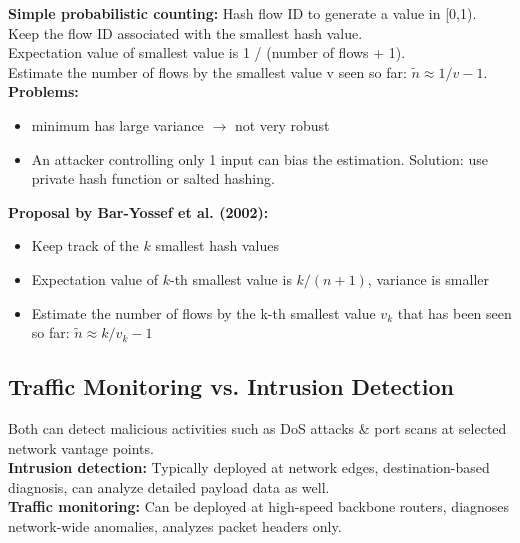 \textbf{Simple probabilistic counting:} Hash flow ID to generate a value in [0,1). Keep the flow ID associated with the smallest hash value.\\
Expectation value of smallest value is 1 / (number of flows + 1).\\
Estimate the number of flows by the smallest value v seen so far: $\tilde{n} \approx 1/v - 1$.\\

\textbf{Problems:}
\begin{itemize}
	\item minimum has large variance $\rightarrow$ not very robust
	\item An attacker controlling only 1 input can bias the estimation. Solution: use private hash function or salted hashing.
\end{itemize}

\textbf{Proposal by Bar-Yossef et al. (2002):}

\begin{itemize}
	\item Keep track of the $k$ smallest hash values
	\item Expectation value of $k$-th smallest value is $k/(n+1)$, variance is smaller
	\item Estimate the number of flows by the k-th smallest value $v_k$ that has been seen
	so far: $\tilde{n} \approx k / v_k - 1$
\end{itemize}

\subsection{Traffic Monitoring vs. Intrusion Detection}

Both can detect malicious activities such as DoS attacks \& port scans at selected network
vantage points.\\
\textbf{Intrusion detection:} Typically deployed at network edges, destination-based diagnosis, can analyze detailed payload data as well.\\
\textbf{Traffic monitoring:} Can be deployed at high-speed backbone routers, diagnoses network-wide anomalies, analyzes packet headers only.
